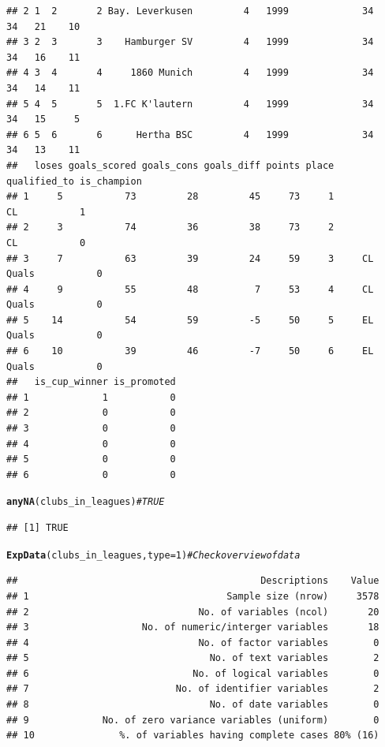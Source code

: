 \documentclass{article}\usepackage[]{graphicx}\usepackage[]{color}
\makeatletter
\newcommand{\hlnum}[1]{\textcolor[rgb]{0.686,0.059,0.569}{#1}}%
\newcommand{\hlcom}[1]{\textcolor[rgb]{0.678,0.584,0.686}{\textit{#1}}}%
\newcommand{\hlstd}[1]{\textcolor[rgb]{0.345,0.345,0.345}{#1}}%
\newcommand{\hlkwc}[1]{\textcolor[rgb]{0.333,0.667,0.333}{#1}}%
\newcommand{\hlkwd}[1]{\textcolor[rgb]{0.737,0.353,0.396}{\textbf{#1}}}%
\newenvironment{kframe}{%
 \def\at@end@of@kframe{}%
 \ifinner\ifhmode%
  \def\at@end@of@kframe{\end{minipage}}%
  \begin{minipage}{\columnwidth}%
 \fi\fi%
 \def\FrameCommand##1{\hskip\@totalleftmargin \hskip-\fboxsep
 \colorbox{shadecolor}{##1}\hskip-\fboxsep
     \hskip-\linewidth \hskip-\@totalleftmargin \hskip\columnwidth}%
 \MakeFramed {\advance\hsize-\width
   \@totalleftmargin\z@ \linewidth\hsize
   \@setminipage}}%
 {\par\unskip\endMakeFramed%
 \at@end@of@kframe}
\newenvironment{knitrout}{}{} %
\makeatother
\begin{document}
\begin{knitrout}
\begin{kframe}
\begin{verbatim}
## 2 1  2       2 Bay. Leverkusen         4   1999             34              34   21    10
## 3 2  3       3    Hamburger SV         4   1999             34              34   16    11
## 4 3  4       4     1860 Munich         4   1999             34              34   14    11
## 5 4  5       5  1.FC K'lautern         4   1999             34              34   15     5
## 6 5  6       6      Hertha BSC         4   1999             34              34   13    11
##   loses goals_scored goals_cons goals_diff points place qualified_to is_champion
## 1     5           73         28         45     73     1           CL           1
## 2     3           74         36         38     73     2           CL           0
## 3     7           63         39         24     59     3     CL Quals           0
## 4     9           55         48          7     53     4     CL Quals           0
## 5    14           54         59         -5     50     5     EL Quals           0
## 6    10           39         46         -7     50     6     EL Quals           0
##   is_cup_winner is_promoted
## 1             1           0
## 2             0           0
## 3             0           0
## 4             0           0
## 5             0           0
## 6             0           0
\end{verbatim}
\begin{alltt}
\hlkwd{anyNA}\hlstd{(clubs_in_leagues)} \hlcom{# TRUE}
\end{alltt}
\begin{verbatim}
## [1] TRUE
\end{verbatim}
\begin{alltt}
\hlkwd{ExpData}\hlstd{(clubs_in_leagues,} \hlkwc{type}\hlstd{=}\hlnum{1}\hlstd{)} \hlcom{# Check overview of data}
\end{alltt}
\begin{verbatim}
##                                           Descriptions    Value
## 1                                   Sample size (nrow)     3578
## 2                              No. of variables (ncol)       20
## 3                    No. of numeric/interger variables       18
## 4                              No. of factor variables        0
## 5                                No. of text variables        2
## 6                             No. of logical variables        0
## 7                          No. of identifier variables        2
## 8                                No. of date variables        0
## 9             No. of zero variance variables (uniform)        0
## 10               %. of variables having complete cases 80% (16)

\end{verbatim}
\end{kframe}
\end{knitrout}
\end{document}
